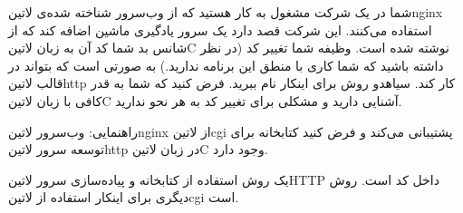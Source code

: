 
شما در یک شرکت مشغول به کار هستید که از وب‌سرور شناخته شده‌ی ‌لاتین{nginx} استفاده می‌کنند. این شرکت قصد دارد یک سرور یادگیری ماشین اضافه کند که از شانس بد شما کد آن به زبان ‌لاتین{C} نوشته شده است.
وظیفه شما تغییر کد (در نظر داشته باشید که شما کاری با منطق این برنامه ندارید.) به صورتی است که بتواند در قالب ‌لاتین{http} کار کند.
‌سیاه{دو روش} برای اینکار نام ببرید. فرض کنید که شما به قدر کافی با زبان ‌لاتین{C} آشنایی دارید و مشکلی برای تغییر کد به هر نحو ندارید.

راهنمایی: وب‌سرور ‌لاتین{nginx} از ‌لاتین{cgi} پشتیبانی می‌کند و فرض کنید کتابخانه برای توسعه سرور ‌لاتین{http} در زبان ‌لاتین{C} وجود دارد.

\begin{پاسخ}

یک روش استفاده از کتابخانه و پیاده‌سازی سرور ‌لاتین{HTTP} داخل کد است.
روش دیگری برای اینکار استفاده از ‌لاتین{cgi} است.

\end{پاسخ}

